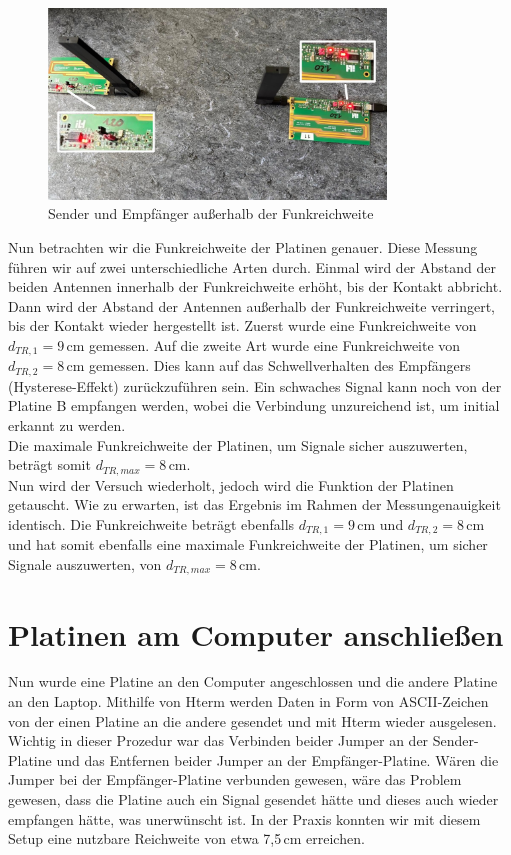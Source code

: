 \begin{figure}[H]
    \centering
    \includegraphics[width=0.8\textwidth]{Pictures/Task2a.jpg}
    \caption{Sender und Empfänger außerhalb der Funkreichweite}
    \label{fig:Task2a}
\end{figure}
Nun betrachten wir die Funkreichweite der Platinen genauer. Diese Messung führen wir auf zwei unterschiedliche
Arten durch. Einmal wird der Abstand der beiden Antennen innerhalb der Funkreichweite erhöht, bis der Kontakt
abbricht. Dann wird der Abstand der Antennen außerhalb der Funkreichweite verringert, bis der Kontakt wieder
hergestellt ist. Zuerst wurde eine Funkreichweite von $d_{TR,1}=9\,\text{cm}$ gemessen. Auf die zweite Art wurde eine
Funkreichweite von $d_{TR,2}=8\,\text{cm}$ gemessen. Dies kann auf das Schwellverhalten des Empfängers (Hysterese-Effekt)
zurückzuführen sein. 
Ein schwaches Signal kann noch von der Platine B empfangen werden, wobei die Verbindung unzureichend ist, um 
initial erkannt zu werden.\\
Die maximale Funkreichweite der Platinen, um Signale sicher auszuwerten, beträgt somit $d_{TR,max}=8\,\text{cm}$.
\\
Nun wird der Versuch wiederholt, jedoch wird die Funktion der Platinen getauscht. Wie zu erwarten, ist das Ergebnis
im Rahmen der Messungenauigkeit identisch. Die Funkreichweite beträgt ebenfalls $d_{TR,1}=9\,\text{cm}$ und $d_{TR,2}=8\,\text{cm}$ und 
hat somit ebenfalls eine maximale Funkreichweite der Platinen, um sicher Signale auszuwerten, von $d_{TR,max}=8\,\text{cm}$.

\section{Platinen am Computer anschließen}
Nun wurde eine Platine an den Computer angeschlossen und die andere Platine an den Laptop.
Mithilfe von Hterm werden Daten in Form von ASCII-Zeichen von der einen Platine an die andere gesendet
und mit Hterm wieder ausgelesen.
Wichtig in dieser Prozedur war das Verbinden beider Jumper an der Sender-Platine und das Entfernen beider
Jumper an der Empfänger-Platine. 
Wären die Jumper bei der Empfänger-Platine verbunden gewesen, wäre das Problem gewesen, dass die Platine auch 
ein Signal gesendet hätte und dieses auch wieder empfangen hätte, was unerwünscht ist.
In der Praxis konnten wir mit diesem Setup eine nutzbare Reichweite von etwa 7,5\,cm erreichen.

